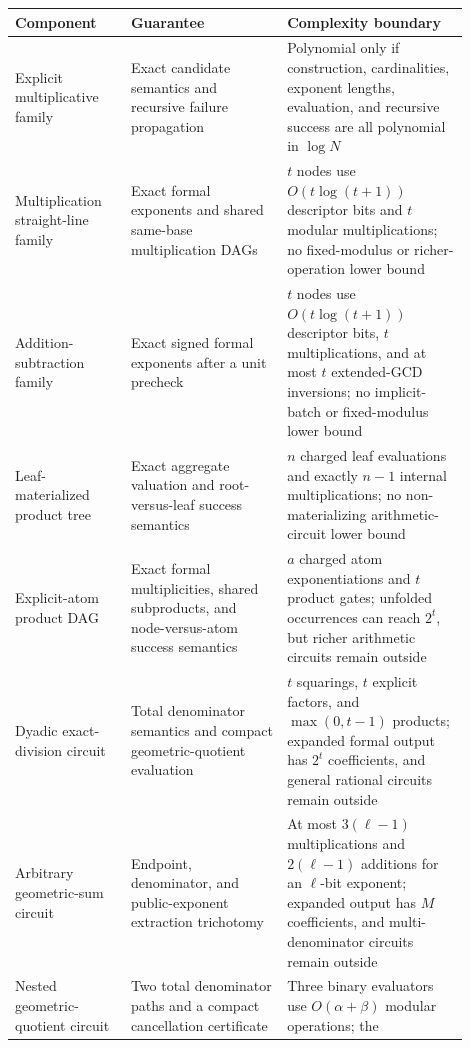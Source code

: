 \documentclass[11pt]{article}
\begin{document}
\begin{center}
\scriptsize
\begin{tabular}{L{0.23\linewidth}L{0.31\linewidth}L{0.36\linewidth}}
\toprule
Component & Guarantee & Complexity boundary \\
\midrule
Explicit multiplicative family &
Exact candidate semantics and recursive failure propagation &
Polynomial only if construction, cardinalities, exponent lengths, evaluation,
and recursive success are all polynomial in \(\log N\) \\
\addlinespace
Multiplication straight-line family &
Exact formal exponents and shared same-base multiplication DAGs &
\(t\) nodes use \(O(t\log(t+1))\) descriptor bits and \(t\) modular
multiplications; no fixed-modulus or richer-operation lower bound \\
\addlinespace
Addition-subtraction family &
Exact signed formal exponents after a unit precheck &
\(t\) nodes use \(O(t\log(t+1))\) descriptor bits, \(t\) multiplications,
and at most \(t\) extended-GCD inversions; no implicit-batch or
fixed-modulus lower bound \\
\addlinespace
Leaf-materialized product tree &
Exact aggregate valuation and root-versus-leaf success semantics &
\(n\) charged leaf evaluations and exactly \(n-1\) internal
multiplications; no non-materializing arithmetic-circuit lower bound \\
\addlinespace
Explicit-atom product DAG &
Exact formal multiplicities, shared subproducts, and node-versus-atom
success semantics &
\(a\) charged atom exponentiations and \(t\) product gates; unfolded
occurrences can reach \(2^t\), but richer arithmetic circuits remain outside \\
\addlinespace
Dyadic exact-division circuit &
Total denominator semantics and compact geometric-quotient evaluation &
\(t\) squarings, \(t\) explicit factors, and \(\max(0,t-1)\) products;
expanded formal output has \(2^t\) coefficients, and general rational
circuits remain outside \\
\addlinespace
Arbitrary geometric-sum circuit &
Endpoint, denominator, and public-exponent extraction trichotomy &
At most \(3(\ell-1)\) multiplications and \(2(\ell-1)\) additions for an
\(\ell\)-bit exponent; expanded output has \(M\) coefficients, and
multi-denominator circuits remain outside \\
\addlinespace
Nested geometric-quotient circuit &
Two total denominator paths and a compact cancellation certificate &
Three binary evaluators use \(O(\alpha+\beta)\) modular operations; the

\end{tabular}
\end{center}
\end{document}

